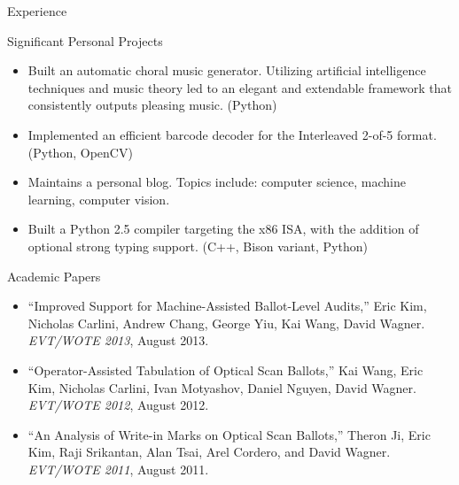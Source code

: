 \documentclass{resume}
\begin{document}
\begin{component}{Experience}
\begin{position}{Significant Personal Projects}{}
	\begin{itemize}
		\vspace{-0.5em}\item Built an automatic choral music generator. Utilizing artificial intelligence techniques and music theory led to an elegant and extendable framework that consistently outputs pleasing music.
		(Python)
        \vspace{-0.5em}\item Implemented an efficient barcode decoder
	        for the Interleaved 2-of-5 format. (Python, OpenCV)
        \vspace{-0.5em}\item Maintains a personal blog. Topics include: 
        computer science, machine learning, computer vision.
		\vspace{-0.5em}\item Built a Python 2.5 compiler targeting the x86 ISA, with the addition of
		optional strong typing support. (C++, Bison variant, Python)
	\end{itemize}
	\end{position}
\end{component}

\vspace{-2.0em}

\begin{component}{Academic Papers}
\vspace{-0.5em}
	\begin{itemize}
        \item[] ``Improved Support for Machine-Assisted Ballot-Level Audits,'' Eric Kim, Nicholas Carlini, Andrew Chang, George Yiu, Kai Wang, David Wagner. \emph{EVT/WOTE 2013}, August 2013.
\vspace{-0.5em}
        \item[] ``Operator-Assisted Tabulation of Optical Scan Ballots,'' Kai Wang, Eric Kim, Nicholas Carlini, Ivan Motyashov, Daniel Nguyen, David Wagner. \emph{EVT/WOTE 2012}, August 2012.
\vspace{-0.5em}
		\item[] ``An Analysis of Write-in Marks on Optical Scan Ballots,'' Theron Ji, Eric Kim, Raji Srikantan, Alan Tsai, Arel Cordero, and David Wagner. \emph{EVT/WOTE 2011}, August 2011.
\vspace{-0.5em}
	\end{itemize}
\end{component}
\end{document}
